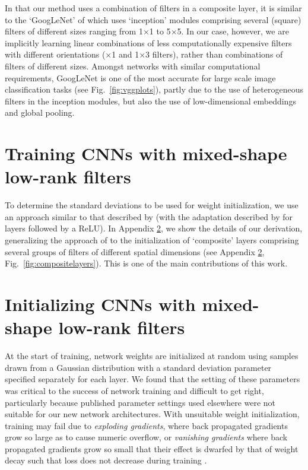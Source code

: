 \documentclass[thesis]{subfiles}
\begin{document}
    In that our method uses a combination of filters in a composite layer, it is similar to the `GoogLeNet' of \citet{Szegedy2014going} which uses `inception' modules comprising several (square) filters of different sizes ranging from 1$\times$1 to 5$\times$5. In our case, however, we are implicitly learning linear combinations of less computationally expensive filters with different orientations ($\times$1 and 1$\times$3 filters), rather than combinations of filters of different sizes. Amongst networks with similar computational requirements, GoogLeNet is one of the most accurate for large scale image classification tasks (see Fig.~\ref{fig:vggplots}), partly due to the use of heterogeneous filters in the inception modules, but also the use of low-dimensional embeddings and global pooling.

    \section{Training CNNs with mixed-shape low-rank filters}
    \label{initialization}
    To determine the standard deviations to be used for weight initialization, we use an approach similar to that described by \citet{glorot2010understanding} (with the adaptation described by \citet{He2015delving} for layers followed by a ReLU). In Appendix \ref{initializationderivation}, we show the details of our derivation, generalizing the approach of \citet{He2015delving} to the initialization of `composite' layers comprising several groups of filters of different spatial dimensions (see Appendix \ref{initializationderivation}, Fig.~\ref{fig:compositelayers}). This is one of the main contributions of this work.
    \section{Initializing CNNs with mixed-shape low-rank filters}
    \label{initializationderivation}
    At the start of training, network weights are initialized at random using samples drawn from a Gaussian distribution with a standard deviation parameter specified separately for each layer. We found that the setting of these parameters was critical to the success of network training and difficult to get right, particularly because published parameter settings used elsewhere were not suitable for our new network architectures. With unsuitable weight initialization, training may fail due to {\em exploding gradients}, where  back propagated gradients grow so large as to cause numeric overflow, or {\em vanishing gradients} where back propagated gradients grow so small that their effect is dwarfed by that of weight decay such that loss does not decrease during training \citep{Hochreiter01gradientflow}.
    
\end{document}
